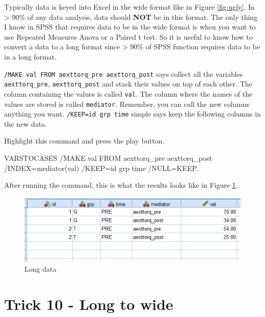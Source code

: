 \documentclass[
]{book}
\newenvironment{Shaded}{\begin{snugshade}}{\end{snugshade}}
\newcommand{\ConstantTok}[1]{\textcolor[rgb]{0.00,0.00,0.00}{#1}}
\newcommand{\FunctionTok}[1]{\textcolor[rgb]{0.00,0.00,0.00}{#1}}
\newcommand{\NormalTok}[1]{#1}
\newcommand{\OtherTok}[1]{\textcolor[rgb]{0.56,0.35,0.01}{#1}}
\newcommand{\SpecialCharTok}[1]{\textcolor[rgb]{0.00,0.00,0.00}{#1}}
\begin{document}
Typically data is keyed into Excel in the wide format like in Figure \ref{fig:ugly}. In \textgreater{} 90\% of any data analysis, data should \textbf{NOT} be in this format. The only thing I know in SPSS that requires data to be in the wide format is when you want to use Repeated Measures Anova or a Paired t test. So it is useful to know how to convert a data to a long format since \textgreater{} 90\% of SPSS function requires data to be in a long format.

\texttt{/MAKE\ val\ FROM\ aexttorq\_pre\ aexttorq\_post} says collect all the variables \texttt{aexttorq\_pre}, \texttt{aexttorq\_post} and stack their values on top of each other. The column containing the values is called \texttt{val}. The column where the names of the values are stored is called \texttt{mediator}. Remember, you can call the new columns anything you want. \texttt{/KEEP=id\ grp\ time} simple says keep the following columns in the new data.

Highlight this command and press the play button.

\begin{Shaded}
\begin{Highlighting}[]
\NormalTok{VARSTOCASES}
  \SpecialCharTok{/}\NormalTok{MAKE val FROM aexttorq\_pre aexttorq\_post }
  \SpecialCharTok{/}\NormalTok{INDEX}\OtherTok{=}\FunctionTok{mediator}\NormalTok{(val) }
  \SpecialCharTok{/}\NormalTok{KEEP}\OtherTok{=}\NormalTok{id grp time}
  \SpecialCharTok{/}\ConstantTok{NULL}\OtherTok{=}\NormalTok{KEEP.}
\end{Highlighting}
\end{Shaded}

After running the command, this is what the results looks like in Figure \ref{fig:tidy}.

\begin{figure}
\includegraphics[width=1\linewidth]{images/long_data} \caption{Long data}\label{fig:tidy}
\end{figure}

\hypertarget{trick10}{%
\chapter{Trick 10 - Long to wide}\label{trick10}}
\end{document}
